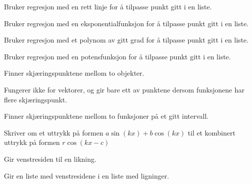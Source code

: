 Bruker regresjon med en rett linje for å tilpasse punkt gitt i en liste.

Bruker regresjon med en eksponentialfunksjon for å tilpasse punkt gitt i en liste.

Bruker regresjon med et polynom av gitt grad for å tilpasse punkt gitt i en liste.

Bruker regresjon med en potensfunksjon for å tilpasse punkt gitt i en liste.

\regsin

\retn

\skalar

Finner skjæringspunktene mellom to objekter. 

\merk Fungerer ikke for vektorer, og gir bare ett av punktene dersom funksjonene har flere skjæringspunkt.

Finner skjæringspunktene mellom to funksjoner på et gitt intervall.

\summ

Skriver om et uttrykk på formen $ a\sin (kx) + b\cos (kx) $ til et kombinert uttrykk på formen $ r\cos (kx-c) $

\trikomb

\vektor

\vekpro

\vend

Gir venstresiden til en likning.

Gir en liste med venstresidene i en liste med ligninger.

\vink






